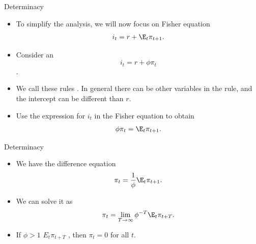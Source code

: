 \documentclass[11pt,xcolor={dvipsnames},aspectratio=159,hyperref={pdftex,pdfpagemode=UseNone,hidelinks,pdfdisplaydoctitle=true},usepdftitle=false]{beamer}
\begin{document}
    \begin{frame}{Determinacy}
        \begin{itemize}
                \item To simplify the analysis, we will now focus on  Fisher equation \begin{align*}
                    i_t = r + \E_t \pi_{t+1}.
                \end{align*}
                \item Consider an  $$i_t =  r + \phi \pi_t$$.
                \item We call these rules . In general there can be other variables in the rule, and the intercept can be different than $r$.
                \item Use the expression for $i_t$ in the Fisher equation to obtain \begin{align*}
                 \phi \pi_t = \E_t \pi_{t+1}. 
                \end{align*}
            \end{itemize}
        \end{frame}

    \begin{frame}{Determinacy}
        \begin{itemize}
                \item We have the difference equation \begin{align*}
                    \pi_t = \frac{1}{\phi}\E_t \pi_{t+1}. 
                   \end{align*}
                \item We can solve it  as 
                   \begin{align*}
                    \pi_t = \lim_{T\to\infty} \phi^{-T} \E_t \pi_{t+T}.
                   \end{align*} 
                \item If $\phi>1$  $E_t \pi_{t+T}$ , then $\pi_t=0$ for all $t$.
            \end{itemize}
        \end{frame}
\end{document}
